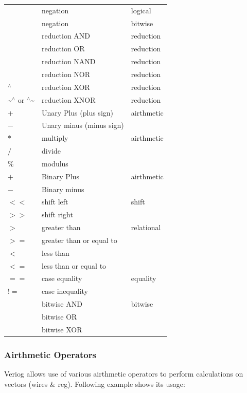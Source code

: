 \documentclass[a4paper,10pt]{article}
\theoremstyle{mytheor}
\newcommand{
  \insertverilog}[3]{
  
}
\begin{document}
\begin{table}[h]
\begin{center}
\begin{tabularx}{.8\textwidth}{|X|X|X|}
      \hline
      \text{!} & negation &  logical\\
      \text{\textasciitilde} & negation &  bit\-wise\\
      \text{\&} & reduction AND & reduction \\
      \text{\textbar} & reduction OR & reduction \\
      \text{\textasciitilde\&} & reduction NAND & reduction \\
      \text{\textasciitilde\textbar} & reduction NOR & reduction \\
      $^\wedge$ & reduction XOR & reduction \\
      \textasciitilde$^\wedge$ or $^\wedge$\textasciitilde & reduction XNOR & reduction \\
      \hline
      $+$ & Unary Plus (plus sign) & airthmetic \\
      $-$ & Unary minus (minus sign) & \\
      \hline
      $*$ & multiply & airthmetic \\
      $/$ & divide &  \\
      \% & modulus &  \\
      \hline
      $+$ & Binary Plus & airthmetic \\
      $-$ & Binary minus &  \\
      \hline
      $<<$ & shift left & shift \\
      $>>$ & shift right &  \\
      \hline
      $>$ & greater than & relational \\
      $>=$  & greater than or equal to & \\
      $<$ & less than  & \\
      $<=$ & less than or equal to & \\
      \hline  
      $==$ & case equality & equality \\
      $!=$  & case inequality & \\
      \hline
      \text{\&} & bitwise AND & bitwise \\
      \text{\textbar} & bitwise OR & \\
      \text{\textasciitilde} & bitwise XOR & \\
      \hline
    \end{tabularx}
  \end{center}
\end{table}

\subsubsection*{Airthmetic Operators}
Veriog allows use of various airthmetic operators to perform
calculations on vectors (wires \& reg). Following example shows its
usage:
\insertverilog{./verilog_files/airthmeticOperators.v}{airthmetic-operators}{\text{Functioning of airthmetic operator}}
\end{document}
